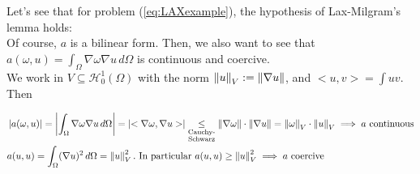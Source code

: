 \newpage

\begin{example}
  Let's see that for problem (\ref{eq:LAXexample}), the hypothesis of Lax-Milgram's lemma holds: \\
  
  Of course, $a$ is a bilinear form. Then, we also want to see that $a(\omega,u) = \int_{\Omega}\nabla \omega \nabla u \, d\Omega$ is continuous and coercive.\\
  
  We work in $V\subseteq \mathcal{H}_0^1(\Omega)$ with the norm $\left\lVert u\right\rVert_V := \left\lVert\nabla u\right\rVert$, and $<u,v> = \displaystyle{\int} uv$. Then
  
\begin{align*}
    &\left\vert a(\omega, u) \right\vert = \left\vert \int_{\Omega}\nabla \omega \nabla u \, d\Omega \right\vert = \left\vert <\nabla\omega,\nabla u> \right\vert \underset{\substack{\text{Cauchy-}\\\text{Schwarz}}}{\leq} \left\lVert\nabla\omega\right\rVert\cdot\left\lVert\nabla u\right\rVert = \left\lVert\omega\right\rVert_V\cdot\left\lVert u\right\rVert_V \implies a \text{ continuous}\\
    &a(u,u) = \int_{\Omega} (\nabla u)^2 \, d\Omega = \left\lVert u\right\rVert_V^2. \text{ In particular } a(u,u) \geq \left\lVert u\right\rVert_V^2 \implies a \text{ coercive}
\end{align*}

  
\end{example}